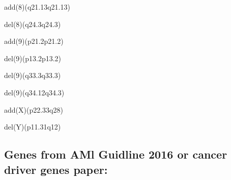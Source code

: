 \documentclass[]{article}
\begin{document}
add(8)(q21.13q21.13)

del(8)(q24.3q24.3)

add(9)(p21.2p21.2)

del(9)(p13.2p13.2)

del(9)(q33.3q33.3)

del(9)(q34.12q34.3)

add(X)(p22.33q28)

del(Y)(p11.31q12)

\hypertarget{genes-from-aml-guidline-2016-or-cancer-driver-genes-paper}{%
\subsection{Genes from AMl Guidline 2016 or cancer driver genes
paper:}\label{genes-from-aml-guidline-2016-or-cancer-driver-genes-paper}}
\end{document}
